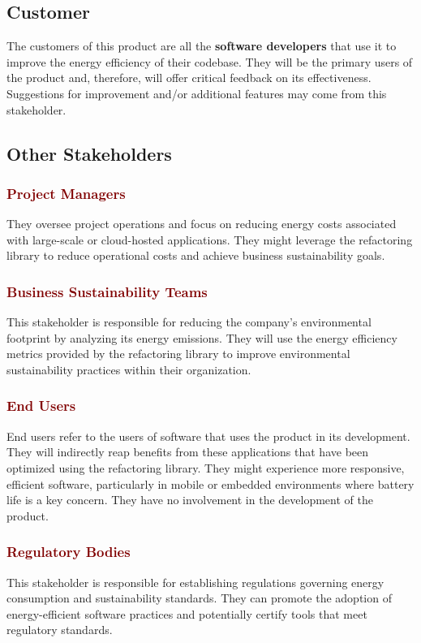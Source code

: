 \documentclass[12pt]{article}
\begin{document}
\subsection{Customer}
The customers of this product are all the \textbf{software developers} that use it to improve the energy efficiency of their codebase. They will be the primary users of the product and, therefore, will offer critical feedback on its effectiveness. Suggestions for improvement and/or additional features may come from this stakeholder. 

\subsection{Other Stakeholders}
\subsubsection*{\textcolor{Maroon}{Project Managers}}
They oversee project operations and focus on reducing energy costs associated with large-scale or cloud-hosted applications. They might leverage the refactoring library to reduce operational costs and achieve business sustainability goals.

\subsubsection*{\textcolor{Maroon}{Business Sustainability Teams}}
This stakeholder is responsible for reducing the company's environmental footprint by analyzing its energy emissions. They will use the energy efficiency metrics provided by the refactoring library to improve environmental sustainability practices within their organization.

\subsubsection*{\textcolor{Maroon}{End Users}}
End users refer to the users of software that uses the product in its development. They will indirectly reap benefits from these applications that have been optimized using the refactoring library. They might experience more responsive, efficient software, particularly in mobile or embedded environments where battery life is a key concern. They have no involvement in the development of the product. 

\subsubsection*{\textcolor{Maroon}{Regulatory Bodies}}
This stakeholder is responsible for establishing regulations governing energy consumption and sustainability standards. They can promote the adoption of energy-efficient software practices and potentially certify tools that meet regulatory standards. 
\end{document}

